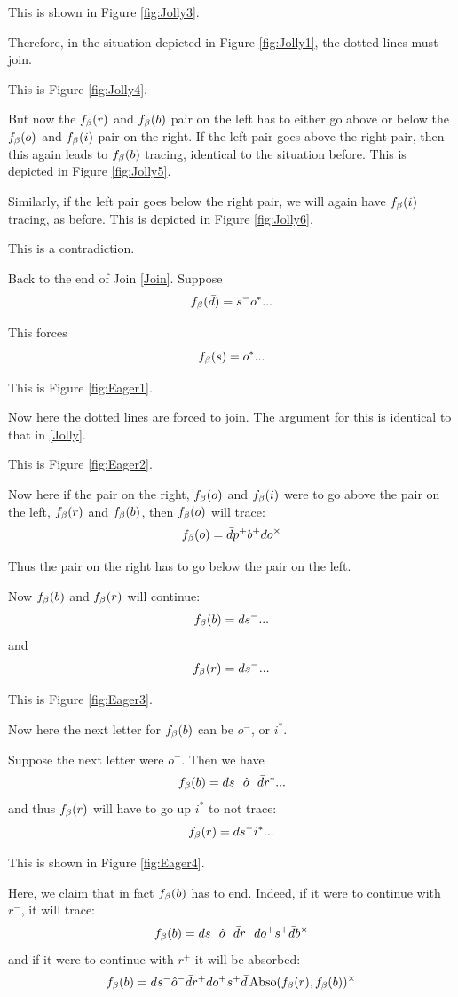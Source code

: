 This is shown in Figure \ref{fig:Jolly3}.


Therefore, in the situation depicted in Figure \ref{fig:Jolly1}, the dotted lines must join. 

This is Figure \ref{fig:Jolly4}.

But now the $f_\beta(r)$ and $f_\beta(b)$ pair on the left has to either go above or below the $f_\beta(o)$ and $f_\beta(i)$ pair on the right. If the left pair goes above the right pair, then this again leads to $f_\beta(b)$ tracing, identical to the situation before. This is depicted in Figure \ref{fig:Jolly5}.

Similarly, if the left pair goes below the right pair, we will again have $f_\beta(i)$ tracing, as before. This is depicted in Figure \ref{fig:Jolly6}.

This is a contradiction.

 \label{Eager}
Back to the end of Join \ref{Join}. Suppose
\[
f_\beta(\bar{d}) = s^- o^*...
\]

This forces 
\[
f_\beta(s) = o^*...
\]

This is Figure \ref{fig:Eager1}.

Now here the dotted lines are forced to join. The argument for this is identical to that in \ref{Jolly}.

This is Figure \ref{fig:Eager2}.

Now here if the pair on the right, $f_\beta(o)$ and $f_\beta(i)$ were to go above the pair on the left, $f_\beta(r)$ and $f_\beta(b)$, then $f_\beta(o)$ will trace:
\[
f_\beta(o) = \bar{d} p^+ b^+ d o^\times
\]

Thus the pair on the right has to go below the pair on the left.

Now $f_\beta(b)$ and $f_\beta(r)$ will continue:
\[
f_\beta(b) = d s^-...
\]
and
\[
f_\beta(r) = d s^-...
\]

This is Figure \ref{fig:Eager3}.

Now here the next letter for $f_\beta(b)$ can be $o^-$, or $i^*$. 

Suppose the next letter were $o^-$. Then we have
\[
f_\beta(b) = d s^- \hat{o}^- \bar{d} r^*...
\]
and thus $f_\beta(r)$ will have to go up $i^*$ to not trace:
\[
f_\beta(r) = d s^- i^*...
\]

This is shown in Figure \ref{fig:Eager4}.

Here, we claim that in fact $f_\beta(b)$ has to end. Indeed,  if it were to continue with $r^-$, it will trace:
\[
f_\beta(b) = d s^- \hat{o}^- \bar{d} r^- d o^+ s^+ \bar{d} b^\times
\]
and if it were to continue with $r^+$ it will be absorbed:
\[
f_\beta(b) = d s^- \hat{o}^- \bar{d} r^+ d o^+ s^+ \bar{d} \operatorname{Abso}(f_\beta(r), f_\beta(b))^\times
\]

